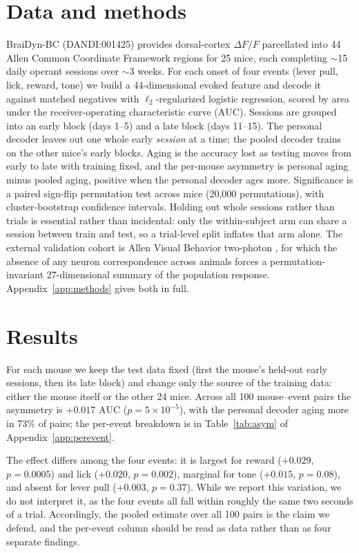 \documentclass[mlabstract,onecolumn]{jmlr}
\newcommand{\auc}{\mathrm{AUC}}
\begin{document}
\section{Data and methods}
BraiDyn-BC \citep{kondo2025} (DANDI:001425) provides dorsal-cortex $\Delta F/F$ parcellated into 44
Allen Common Coordinate Framework regions for 25 mice, each completing $\sim$15 daily operant
sessions over $\sim$3 weeks. For each onset of four events (lever pull, lick, reward, tone) we build
a 44-dimensional evoked feature and decode it against matched negatives with $\ell_2$-regularized
logistic regression, scored by area under the receiver-operating characteristic curve ($\auc$).
Sessions are grouped into an early block (days 1--5) and a late block (days 11--15). The personal
decoder leaves out one whole early \emph{session} at a time; the pooled decoder trains on the other
mice's early blocks. Aging is the accuracy lost as testing moves from early to late with training
fixed, and the per-mouse asymmetry is personal aging minus pooled aging, positive when the personal
decoder ages more. Significance is a paired sign-flip permutation test across mice
(20{,}000 permutations), with cluster-bootstrap confidence intervals. Holding out whole sessions
rather than trials is essential rather than incidental: only the within-subject arm can share a
session between train and test, so a trial-level split inflates that arm alone.
The external validation cohort is Allen Visual Behavior two-photon \citep{allenvb2023}, for which
the absence of any neuron correspondence across animals forces a permutation-invariant 27-dimensional
summary of the population response. Appendix~\ref{app:methods} gives both in full.

\section{Results}
For each mouse we keep the test data fixed (first the mouse's held-out early sessions, then its late
block) and change only the source of the training data: either the mouse itself or the other 24 mice.
Across all 100 mouse--event pairs the asymmetry is $+0.017$ $\auc$ ($p = 5 \times 10^{-5}$), with the
personal decoder aging more in 73\% of pairs; the per-event breakdown is in Table~\ref{tab:asym} of Appendix~\ref{app:perevent}.

The effect differs among the four events: it is largest for reward ($+0.029$, $p = 0.0005$) and lick
($+0.020$, $p = 0.002$), marginal for tone ($+0.015$, $p = 0.08$), and absent for lever pull
($+0.003$, $p = 0.37$). While we report this variation, we do not interpret it, as the four events
all fall within roughly the same two seconds of a trial. Accordingly, the pooled estimate over all
100 pairs is the claim we defend, and the per-event column should be read as data rather than as
four separate findings.
\end{document}
